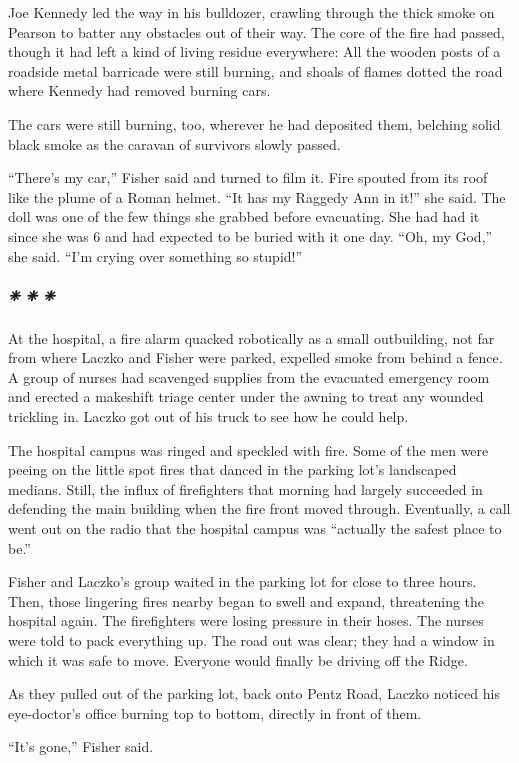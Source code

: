 Joe Kennedy led the way in his bulldozer, crawling through the thick
smoke on Pearson to batter any obstacles out of their way. The core of
the fire had passed, though it had left a kind of living residue
everywhere: All the wooden posts of a roadside metal barricade were
still burning, and shoals of flames dotted the road where Kennedy had
removed burning cars.

The cars were still burning, too, wherever he had deposited them,
belching solid black smoke as the caravan of survivors slowly passed.

``There's my car,'' Fisher said and turned to film it. Fire spouted from
its roof like the plume of a Roman helmet. ``It has my Raggedy Ann in
it!'' she said. The doll was one of the few things she grabbed before
evacuating. She had had it since she was 6 and had expected to be buried
with it one day. ``Oh, my God,'' she said. ``I'm crying over something
so stupid!''

\hypertarget{---11}{%
\subparagraph{❈ ❈ ❈}\label{---11}}

At the hospital, a fire alarm quacked robotically as a small
outbuilding, not far from where Laczko and Fisher were parked, expelled
smoke from behind a fence. A group of nurses had scavenged supplies from
the evacuated emergency room and erected a makeshift triage center under
the awning to treat any wounded trickling in. Laczko got out of his
truck to see how he could help.

The hospital campus was ringed and speckled with fire. Some of the men
were peeing on the little spot fires that danced in the parking lot's
landscaped medians. Still, the influx of firefighters that morning had
largely succeeded in defending the main building when the fire front
moved through. Eventually, a call went out on the radio that the
hospital campus was ``actually the safest place to be.''

Fisher and Laczko's group waited in the parking lot for close to three
hours. Then, those lingering fires nearby began to swell and expand,
threatening the hospital again. The firefighters were losing pressure in
their hoses. The nurses were told to pack everything up. The road out
was clear; they had a window in which it was safe to move. Everyone
would finally be driving off the Ridge.

As they pulled out of the parking lot, back onto Pentz Road, Laczko
noticed his eye-doctor's office burning top to bottom, directly in front
of them.

``It's gone,'' Fisher said.

